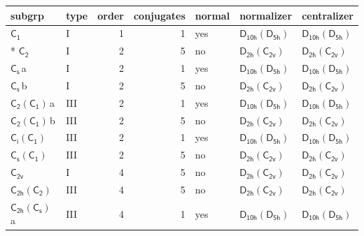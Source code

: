 \documentclass[10pt,a4paper]{article}
\numberwithin{equation}{section}
\newcommand{\grp}[1]{\mathsf{#1}}
\newcommand{\clsletter}[1]{\,{\scriptsize\color{black!55}#1}}
\begin{document}
{\small\begin{longtable}{@{}llrrlll@{}}\toprule
subgrp & type & order & conjugates & normal & normalizer & centralizer\\\midrule\endhead
\bottomrule\endfoot\endlastfoot
\href{../../../rotation/data/pdf/C1.pdf}{$\grp{C_{1}}$} & I & 1 & 1 & yes & \href{D10h-D5h.pdf}{$\grp{D_{10h}}(\grp{D_{5h}})$} & \href{D10h-D5h.pdf}{$\grp{D_{10h}}(\grp{D_{5h}})$}\\*
\href{../../../rotation/data/pdf/C2.pdf}{$\grp{C_{2}}$} & I & 2 & 5 & no & \href{D2h-C2v.pdf}{$\grp{D_{2h}}(\grp{C_{2v}})$} & \href{D2h-C2v.pdf}{$\grp{D_{2h}}(\grp{C_{2v}})$}\\
\href{../../../rotation/data/pdf/C1v.pdf}{$\grp{C_{s}}$}\clsletter{a} & I & 2 & 1 & yes & \href{D10h-D5h.pdf}{$\grp{D_{10h}}(\grp{D_{5h}})$} & \href{D10h-D5h.pdf}{$\grp{D_{10h}}(\grp{D_{5h}})$}\\
\href{../../../rotation/data/pdf/C1v.pdf}{$\grp{C_{s}}$}\clsletter{b} & I & 2 & 5 & no & \href{D2h-C2v.pdf}{$\grp{D_{2h}}(\grp{C_{2v}})$} & \href{D2h-C2v.pdf}{$\grp{D_{2h}}(\grp{C_{2v}})$}\\
\href{C2-C1.pdf}{$\grp{C_{2}}(\grp{C_{1}})$}\clsletter{a} & III & 2 & 1 & yes & \href{D10h-D5h.pdf}{$\grp{D_{10h}}(\grp{D_{5h}})$} & \href{D10h-D5h.pdf}{$\grp{D_{10h}}(\grp{D_{5h}})$}\\
\href{C2-C1.pdf}{$\grp{C_{2}}(\grp{C_{1}})$}\clsletter{b} & III & 2 & 5 & no & \href{D2h-C2v.pdf}{$\grp{D_{2h}}(\grp{C_{2v}})$} & \href{D2h-C2v.pdf}{$\grp{D_{2h}}(\grp{C_{2v}})$}\\
\href{S2-C1.pdf}{$\grp{C_{i}}(\grp{C_{1}})$} & III & 2 & 1 & yes & \href{D10h-D5h.pdf}{$\grp{D_{10h}}(\grp{D_{5h}})$} & \href{D10h-D5h.pdf}{$\grp{D_{10h}}(\grp{D_{5h}})$}\\
\href{C1v-C1.pdf}{$\grp{C_{s}}(\grp{C_{1}})$} & III & 2 & 5 & no & \href{D2h-C2v.pdf}{$\grp{D_{2h}}(\grp{C_{2v}})$} & \href{D2h-C2v.pdf}{$\grp{D_{2h}}(\grp{C_{2v}})$}\\
\href{../../../rotation/data/pdf/C2v.pdf}{$\grp{C_{2v}}$} & I & 4 & 5 & no & \href{D2h-C2v.pdf}{$\grp{D_{2h}}(\grp{C_{2v}})$} & \href{D2h-C2v.pdf}{$\grp{D_{2h}}(\grp{C_{2v}})$}\\
\href{C2h-C2.pdf}{$\grp{C_{2h}}(\grp{C_{2}})$} & III & 4 & 5 & no & \href{D2h-C2v.pdf}{$\grp{D_{2h}}(\grp{C_{2v}})$} & \href{D2h-C2v.pdf}{$\grp{D_{2h}}(\grp{C_{2v}})$}\\
\href{C2h-C1v.pdf}{$\grp{C_{2h}}(\grp{C_{s}})$}\clsletter{a} & III & 4 & 1 & yes & \href{D10h-D5h.pdf}{$\grp{D_{10h}}(\grp{D_{5h}})$} & \href{D10h-D5h.pdf}{$\grp{D_{10h}}(\grp{D_{5h}})$}\\

\end{longtable}}
\end{document}

